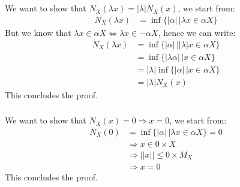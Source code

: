 \documentclass{article}
\begin{document}
\subsection{}%
\subsubsection{}%



\subsubsection{}%

We want to show that $N_X(\lambda x) = |\lambda|N_X(x)$, we start from:
\begin{align*}
	N_X(\lambda x) &= \inf\{|\alpha | \, | \lambda x \in \alpha X\}
\end{align*}
But we know that $\lambda x \in \alpha X \Leftrightarrow \lambda x \in -\alpha X$, hence we can write:
\begin{align*}
	N_X(\lambda x) &= \inf\{|\alpha | \, | |\lambda| x \in \alpha X\}\\
	&= \inf\{|\lambda \alpha | \, | x \in \alpha X\}\\
	&= |\lambda|\inf\{|\alpha | \, | x \in \alpha X\}\\
	&= |\lambda|N_X(x)
\end{align*}
This concludes the proof.
\subsubsection{}%
We want to show that $N_X(x) = 0 \Rightarrow x=0$, we start from:
\begin{align*}
	N_X(0) &= \inf\{|\alpha | \, | \lambda x \in \alpha X\} = 0\\
	&\Rightarrow x \in 0 \times X\\
	&\Rightarrow ||x|| \leq 0 \times M_X\\
	&\Rightarrow x = 0
\end{align*}
This concludes the proof.


\subsubsection{}%



 






\end{document}
